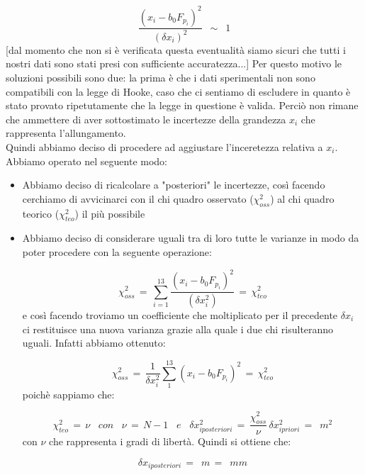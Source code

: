 \begin{equation*}
	\frac{(x_i - b_0 F_{p_i})^2}{(\delta x_i)^2} \,\,\, \sim \,\,\, 1
\end{equation*}
%
[dal momento che non si è verificata questa eventualità siamo sicuri che tutti i nostri dati sono stati presi con sufficiente accuratezza...]
Per questo motivo le soluzioni possibili sono due: la prima è che i dati sperimentali non sono compatibili con la legge di Hooke, caso che ci sentiamo di escludere in quanto è stato provato ripetutamente che la legge in questione è valida. Perciò non rimane che ammettere di aver sottostimato le incertezze della grandezza $x_i$ che rappresenta l'allungamento.\\
Quindi abbiamo deciso di procedere ad aggiustare l'inceretezza relativa a $x_i$. Abbiamo operato nel seguente modo:
\begin{itemize}
\item{Abbiamo deciso di ricalcolare a "posteriori" le incertezze, così facendo cerchiamo di avvicinarci con il chi quadro osservato ($\chi_{oss}^2$) al chi quadro teorico ($\chi_{teo}^2$) il più possibile}
\item{Abbiamo deciso di considerare uguali tra di loro tutte le varianze in modo da poter procedere con la seguente operazione:

	\begin{equation*}
		\chi_{oss}^2 \,=\, \sum_{i=1}^{13} \frac{(x_i - b_0 F_{p_i})^2}{(\delta x_i^2)} \,=\, \chi_{teo}^2 
	\end{equation*}
	e così facendo troviamo un coefficiente che moltiplicato per il precedente $\delta x_i$ ci restituisce una nuova varianza grazie alla quale i due chi risulteranno uguali. Infatti abbiamo ottenuto:
	
	\begin{equation*}
		\chi_{oss}^2 \,=\, \frac{1}{\delta x_{i}^2} \sum_{1}^{13} (x_i - b_0 F_{p_i})^2  \,=\, \chi_{teo}^2
	\end{equation*}
	poichè sappiamo che:
	
	\begin{equation*}
		\chi_{teo}^2 \,=\, \nu \,\,\,\,\, con \,\,\,\,\,
		\nu \,=\, N - 1 \,\,\,\,\, e \,\,\,\,\,
		\delta x_{iposteriori}^2 \,=\, \frac{\chi_{oss}^2}{\nu} \, \delta x_{ipriori}^2 \,=\,  \,\, m^2
	\end{equation*}
	con $\nu$ che rappresenta i gradi di libertà.
	Quindi si ottiene che:
	
	\begin{equation*}
		\delta x_{iposteriori} \,=\,  \,\, m \,=\,  \,\, mm
	\end{equation*}}	 
\end{itemize}
